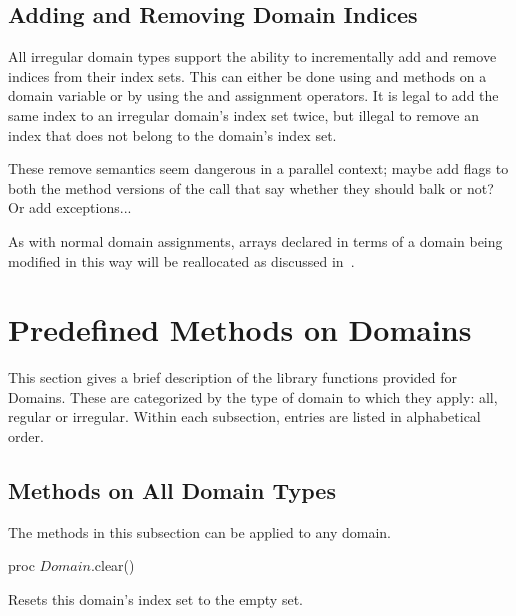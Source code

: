 \subsection{Adding and Removing Domain Indices}
\label{Adding_and_Removing_Domain_Indices}

All irregular domain types support the ability to incrementally add
and remove indices from their index sets.  This can either be done
using  and  methods on a
domain variable or by using the \chpl{+=} and \chpl{-=} assignment
operators.  It is legal to add the same index to an irregular domain's
index set twice, but illegal to remove an index that does not belong
to the domain's index set.

\begin{openissue}
These remove semantics seem dangerous in a parallel context; maybe
add flags to both the method versions of the call that say whether
they should balk or not?  Or add exceptions...
\end{openissue}

As with normal domain assignments, arrays declared in terms of a
domain being modified in this way will be reallocated as discussed
in~.


\section{Predefined Methods on Domains}

This section gives a brief description of the library functions provided for
Domains.  These are categorized by the type of domain to which they apply: all,
regular or irregular.  Within each subsection, entries are listed in
alphabetical order.

\subsection{Methods on All Domain Types}

The methods in this subsection can be applied to any domain.

\begin{protohead}
proc $Domain$.clear()
\end{protohead}
\begin{protobody}
Resets this domain's index set to the empty set.
\end{protobody}

